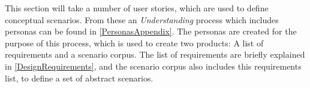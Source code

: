 This section will take a number of user stories, which are used to define conceptual scenarios. From these an \textit{Understanding} process which includes personas can be found in \cref{PersonasAppendix}. The personas are created for the purpose of this process, which is used to create two products: A list of requirements and a scenario corpus. The list of requirements are briefly explained in \cref{DesignRequirements}, and the scenario corpus also includes this requirements list, to define a set of abstract scenarios.
